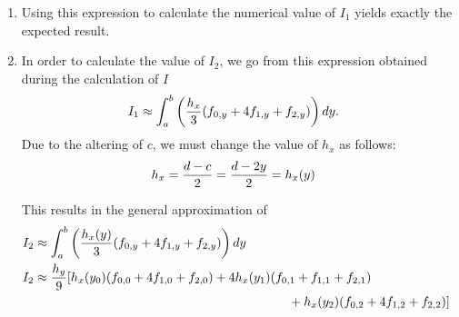 \documentclass[12pt]{article}
\DeclarePairedDelimiter\rb{(}{)}
\begin{document}
\begin{enumerate}[label=(\alph*)]
    \item 
Using this expression to calculate the numerical value of \(I_{1}\) yields exactly the expected result.

\item 

In order to calculate the value of \(I_{2}\), we go from this expression obtained during the calculation of \(I\)
\begin{align*}
    I_{1} & \approx  \int_{a}^{b} {\rb*{\frac{h_{x}}{3} \rb*{f_{0,y} + 4 f_{1,y} + f_{2,y}}}} \,d y . &\\
\end{align*}
Due to the altering of \(c\), we must change the value of \(h_{x}\) as follows:
\begin{align*}
    h_{x} & = \frac{d - c}{2} = \frac{d - 2 y}{2} = h_{x} \rb*{y}&\\
\end{align*}

This results in the general approximation of 
\begin{align*}
    I_{2} & \approx  \int_{a}^{b} {\rb*{\frac{h_{x} \rb*{y}}{3} \rb*{f_{0,y} + 4 f_{1,y} + f_{2,y}}}} \,d y  &\\
    I_{2} & \approx \frac{h_{y}}{9} [
        h_{x}\rb*{y_{0}} \rb*{f_{0,0} + 4 f_{1,0} + f_{2,0}} +
        4 h_{x}\rb*{y_{1}} \rb*{f_{0,1} + f_{1,1} + f_{2,1}} &\\
& \hspace{200 px} + 
        h_{x}\rb*{y_{2}} \rb*{f_{0,2} + 4 f_{1,2} + f_{2,2}}
    ] &\\
\end{align*}

\end{enumerate}
\end{document}
